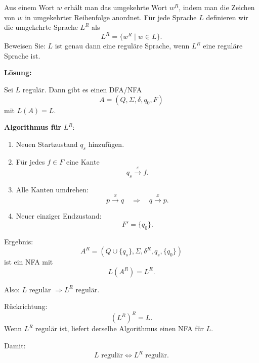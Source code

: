 \documentclass[a4paper,12pt]{article}
\begin{document}
Aus einem Wort $w$ erhält man das umgekehrte Wort $w^R$, indem man die Zeichen von $w$ in umgekehrter Reihenfolge anordnet. Für jede Sprache $L$ definieren wir die umgekehrte Sprache $L^R$ als
\[
L^R = \{w^R \mid w \in L\}.
\]
Beweisen Sie: $L$ ist genau dann eine reguläre Sprache, wenn $L^R$ eine reguläre Sprache ist.

\medskip
\textbf{Lösung:}

Sei $L$ regulär. Dann gibt es einen DFA/NFA
\[
A=(Q,\Sigma,\delta,q_0,F)
\]
mit $L(A)=L$.

\textbf{Algorithmus für } $L^R$:
\begin{enumerate}
    \item Neuen Startzustand $q_s$ hinzufügen.
    \item Für jedes $f\in F$ eine Kante
    \[
    q_s \xrightarrow{\varepsilon} f.
    \]
    \item Alle Kanten umdrehen:
    \[
    p\xrightarrow{x}q
    \quad\Rightarrow\quad
    q\xrightarrow{x}p.
    \]
    \item Neuer einziger Endzustand:
    \[
    F'=\{q_0\}.
    \]
\end{enumerate}

Ergebnis:
\[
A^R=(Q\cup\{q_s\},\Sigma,\delta^R,q_s,\{q_0\})
\]
ist ein NFA mit
\[
L(A^R)=L^R.
\]

Also: $L$ regulär $\Rightarrow L^R$ regulär.

Rückrichtung:
\[
(L^R)^R=L.
\]
Wenn $L^R$ regulär ist, liefert derselbe Algorithmus einen NFA für $L$.

Damit:
\[
L \text{ regulär}
\Longleftrightarrow
L^R \text{ regulär}.
\]
\end{document}
